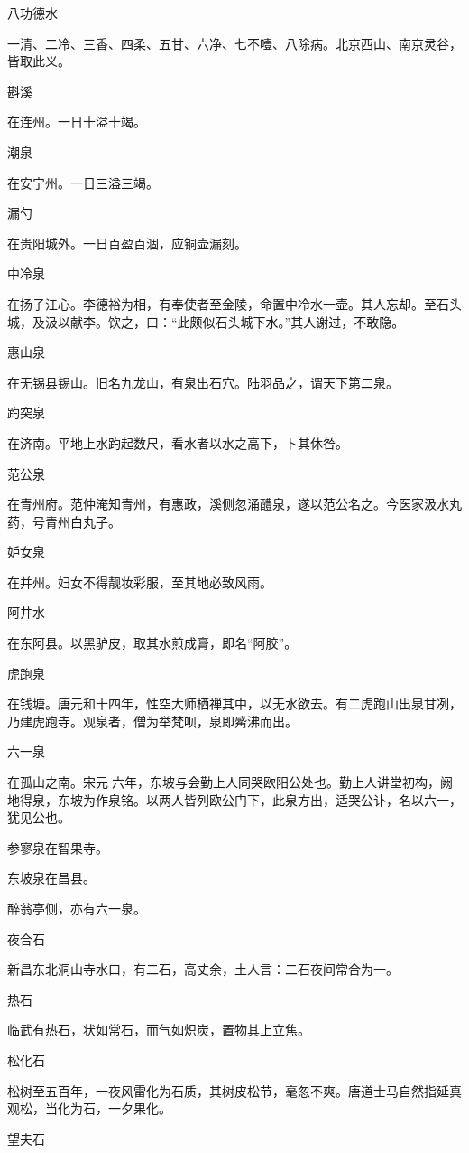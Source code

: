 \documentclass[a4paper,12pt,UTF8,twoside]{ctexbook}
\begin{document}
八功德水

一清、二冷、三香、四柔、五甘、六净、七不噎、八除病。北京西山、南京灵谷，皆取此义。

斟溪

在连州。一日十溢十竭。

潮泉

在安宁州。一日三溢三竭。

漏勺

在贵阳城外。一日百盈百涸，应铜壶漏刻。

中冷泉

在扬子江心。李德裕为相，有奉使者至金陵，命置中冷水一壶。其人忘却。至石头城，及汲以献李。饮之，曰：“此颇似石头城下水。”其人谢过，不敢隐。

惠山泉

在无锡县锡山。旧名九龙山，有泉出石穴。陆羽品之，谓天下第二泉。

趵突泉

在济南。平地上水趵起数尺，看水者以水之高下，卜其休咎。

范公泉

在青州府。范仲淹知青州，有惠政，溪侧忽涌醴泉，遂以范公名之。今医家汲水丸药，号青州白丸子。

妒女泉

在并州。妇女不得靓妆彩服，至其地必致风雨。

阿井水

在东阿县。以黑驴皮，取其水煎成膏，即名“阿胶”。

虎跑泉

在钱塘。唐元和十四年，性空大师栖禅其中，以无水欲去。有二虎跑山出泉甘冽，乃建虎跑寺。观泉者，僧为举梵呗，泉即觱沸而出。

六一泉

在孤山之南。宋元六年，东坡与会勤上人同哭欧阳公处也。勤上人讲堂初构，阙地得泉，东坡为作泉铭。以两人皆列欧公门下，此泉方出，适哭公讣，名以六一，犹见公也。

参寥泉在智果寺。

东坡泉在昌县。

醉翁亭侧，亦有六一泉。

夜合石

新昌东北洞山寺水口，有二石，高丈余，土人言：二石夜间常合为一。

热石

临武有热石，状如常石，而气如炽炭，置物其上立焦。

松化石

松树至五百年，一夜风雷化为石质，其树皮松节，毫忽不爽。唐道士马自然指延真观松，当化为石，一夕果化。

望夫石
\end{document}
